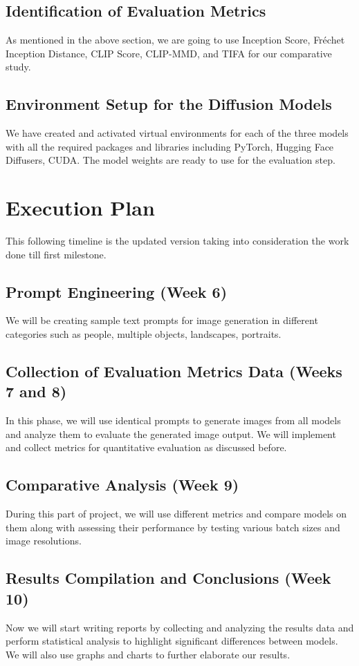 \documentclass{article}
\begin{document}
\subsection{Identification of Evaluation Metrics}
As mentioned in the above section, we are going to use Inception Score, Fréchet Inception Distance, CLIP Score, CLIP-MMD, and TIFA for our comparative study.

\subsection{Environment Setup for the Diffusion Models}
We have created and activated virtual environments for each of the three models with all the required packages and libraries including PyTorch, Hugging Face Diffusers, CUDA. The model weights are ready to use for the evaluation step.




\section{Execution Plan}
This following timeline is the updated version taking into consideration the work done till first milestone.

\subsection{Prompt Engineering (Week 6)}
We will be creating sample text prompts for image generation in different categories such as
people, multiple objects, landscapes, portraits.

\subsection{Collection of Evaluation Metrics Data (Weeks 7 and 8)}
In this phase, we will use identical prompts to generate images from all models and
analyze them to evaluate the generated image output. We will implement and collect metrics for quantitative evaluation as discussed before.

\subsection{Comparative Analysis (Week 9)}
During this part of project, we will use different metrics and compare models on them along with assessing their performance by testing various batch sizes and image resolutions.

\subsection{Results Compilation and Conclusions (Week 10)}
Now we will start writing reports by collecting and analyzing the results data and perform
statistical analysis to highlight significant differences between models. We will also use
graphs and charts to further elaborate our results.
\end{document}
